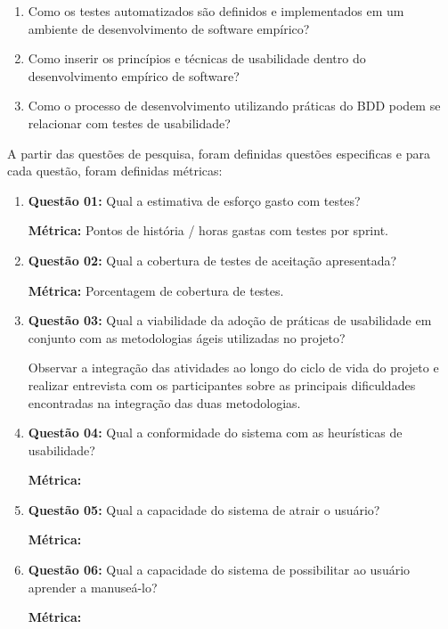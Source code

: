 \begin{enumerate}
\item Como os testes automatizados são definidos e implementados em um ambiente de desenvolvimento de software empírico?
\item Como inserir os princípios e técnicas de usabilidade dentro do desenvolvimento empírico de software?
\item Como o processo de desenvolvimento utilizando práticas do BDD podem se relacionar com testes de usabilidade?
\end{enumerate}

A partir das questões de pesquisa, foram definidas questões especificas e para cada questão, foram definidas métricas:



\begin{enumerate}
\item \textbf{Questão 01: }Qual a estimativa de esforço gasto com testes?

	\textbf{Métrica: } Pontos de história / horas gastas com testes por sprint.

\item \textbf{Questão 02: }Qual a cobertura de testes de aceitação apresentada?

	\textbf{Métrica: } Porcentagem de cobertura de testes.

\item \textbf{Questão 03: }Qual a viabilidade da adoção de práticas de usabilidade em conjunto com as metodologias ágeis utilizadas no projeto?

	Observar a integração das atividades ao longo do ciclo de vida do projeto e realizar entrevista com os participantes sobre as principais dificuldades encontradas na integração das duas metodologias.
\item \textbf{Questão 04: }Qual a conformidade do sistema com as heurísticas de usabilidade?

	\textbf{Métrica: }
\item \textbf{Questão 05: }Qual a capacidade do sistema de atrair o usuário?
	
	\textbf{Métrica: }
\item \textbf{Questão 06:} Qual a capacidade do sistema de possibilitar ao usuário aprender a manuseá-lo?

	\textbf{Métrica: }
\end{enumerate}

